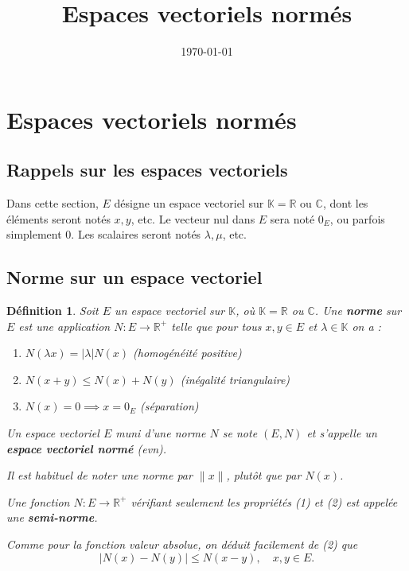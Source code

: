\documentclass{article}
\title{Espaces vectoriels normés}
\date{\today}
\newtheorem{definition}{Définition}
\newcommand{\K}{\mathbb{K}}
\newcommand{\R}{\mathbb{R}}
\newcommand{\C}{\mathbb{C}}
\begin{document}
\maketitle
\sloppy

\section{Espaces vectoriels normés}

\subsection{Rappels sur les espaces vectoriels}
Dans cette section, $E$ désigne un espace vectoriel sur $\K = \R$ ou $\C$, dont les éléments seront notés $x, y$, etc. Le vecteur nul dans $E$ sera noté $0_E$, ou parfois simplement $0$. Les scalaires seront notés $\lambda, \mu$, etc.

\subsection{Norme sur un espace vectoriel}

\begin{definition}
Soit $E$ un espace vectoriel sur $\K$, où $\K = \R$ ou $\C$. Une \textbf{norme} sur $E$ est une application $N : E \to \R^+$ telle que pour tous $x, y \in E$ et $\lambda \in \K$ on a :
\begin{enumerate}
    \item $N(\lambda x) = |\lambda| N(x)$ (homogénéité positive)
    \item $N(x + y) \leq N(x) + N(y)$ (inégalité triangulaire)
    \item $N(x) = 0 \implies x = 0_E$ (séparation)
\end{enumerate}
Un espace vectoriel $E$ muni d'une norme $N$ se note $(E, N)$ et s'appelle un \textbf{espace vectoriel normé} (evn).

Il est habituel de noter une norme par $\|x\|$, plutôt que par $N(x)$.

Une fonction $N : E \to \R^+$ vérifiant seulement les propriétés (1) et (2) est appelée une \textbf{semi-norme}.

Comme pour la fonction valeur absolue, on déduit facilement de (2) que
\begin{equation}
|N(x) - N(y)| \leq N(x - y), \quad x, y \in E.
\end{equation}
\end{definition}
\end{document}
